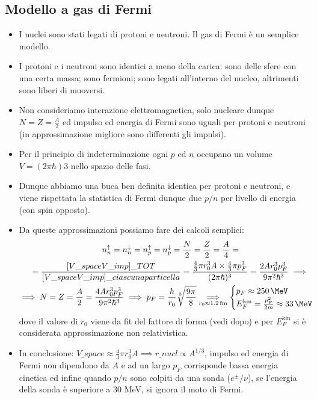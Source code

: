 \subsection{Modello a gas di Fermi}
\begin{itemize}
    \item I nuclei sono stati legati di protoni e neutroni. Il gas di Fermi è un semplice modello.
    \item I protoni e i neutroni sono identici a meno della carica: sono delle sfere con una certa massa; sono fermioni; sono legati all'interno del nucleo, altrimenti sono liberi di muoversi. 
    \item Non consideriamo interazione elettromagnetica, solo nucleare dunque $N=Z=\frac A2$ ed impulso ed energia di Fermi sono uguali per protoni e neutroni (in approssimazione migliore sono differenti gli impulsi). 
    \item Per il principio di indeterminazione ogni $p$ ed $n$ occupano un volume $V=(2\pi\hbar)3$ nello spazio delle fasi.
    \item Dunque abbiamo una buca ben definita identica per protoni e neutroni, e viene rispettata la statistica di Fermi dunque due $p/n$ per livello di energia (con spin opposto).
    \item Da queste approssimazioni possiamo fare dei calcoli semplici:
    \begin{gather*}
    n_n^\uparrow=n_n^\downarrow=n_p^\uparrow=n_p^\downarrow=\frac N2=\frac Z2=\frac A4=\\
    =\frac{[V\_{space}V\_{imp}]\_{TOT}}{[V\_{space}V\_{imp}]\_{ciascuna particella}}=\frac{\frac43\pi r_0^3A\times\frac43\pi p_F^3}{(2\pi\hbar)^3}=\frac{2Ar_0^3p_F^3}{9\pi^2\hbar^3}\implies\\
    \implies N=Z=\frac A2=\frac{4Ar_0^3p_F^3}{9\pi^2\hbar^3}\implies p_F=\frac\hbar{r_0}\sqrt[3]{\frac{9\pi}8}\underset{r_0\approx1.2\,\text{fm}}{\implies}
    \begin{cases}
    p_F\approx250\,\MeV\\
    E_F^{\text{kin}}=\frac{p_F^2}{2m}\approx33\,\MeV
    \end{cases}
    \end{gather*}
    dove il valore di $r_0$ viene da fit del fattore di forma (vedi dopo) e per $E^{\text{kin}}_F$ si è considerata approssimazione non relativistica. 
    \item In conclusione: $V\_{space}\approx\frac43\pi r_0^3A\implies r\_{nucl}\propto A^{1/3}$, impulso ed energia di Fermi non dipendono da $A$ e ad un largo $p_F$ corrisponde bassa energia cinetica ed infine quando $p/n$ sono colpiti da una sonda ($e^\pm/\nu$), se l'energia della sonda è superiore a 30 MeV, si ignora il moto di Fermi.  
\end{itemize}
